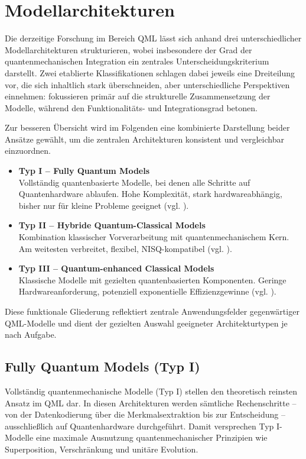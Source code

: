 \section{Modellarchitekturen}

Die derzeitige Forschung im Bereich QML lässt sich anhand drei unterschiedlicher Modellarchitekturen strukturieren, wobei insbesondere der Grad der quantenmechanischen Integration ein zentrales Unterscheidungskriterium darstellt. Zwei etablierte Klassifikationen
schlagen dabei jeweils eine Dreiteilung vor, die sich inhaltlich stark überschneiden, aber unterschiedliche Perspektiven einnehmen: \cite{chengNoisyIntermediatescaleQuantum2023} fokussieren primär auf die strukturelle Zusammensetzung der Modelle, während \cite{mitarai_k_et_al_quantum_2018} den Funktionalitäts- und Integrationsgrad betonen.

Zur besseren Übersicht wird im Folgenden eine kombinierte Darstellung beider Ansätze gewählt, um die zentralen Architekturen konsistent und vergleichbar einzuordnen. 


\begin{itemize}
  \item \textbf{Typ I – Fully Quantum Models} \\
  Vollständig quantenbasierte Modelle, bei denen alle Schritte auf Quantenhardware ablaufen. Hohe Komplexität, stark hardwareabhängig, bisher nur für kleine Probleme geeignet (vgl. \cite{chengNoisyIntermediatescaleQuantum2023, mitarai_k_et_al_quantum_2018}).

  \item \textbf{Typ II – Hybride Quantum-Classical Models} \\
  Kombination klassischer Vorverarbeitung mit quantenmechanischem Kern. Am weitesten verbreitet, flexibel, NISQ-kompatibel (vgl. \cite{mitarai_k_et_al_quantum_2018}).

  \item \textbf{Typ III – Quantum-enhanced Classical Models} \\
  Klassische Modelle mit gezielten quantenbasierten Komponenten. Geringe Hardwareanforderung, potenziell exponentielle Effizienzgewinne (vgl. \cite{chengNoisyIntermediatescaleQuantum2023}).
\end{itemize}


Diese funktionale Gliederung reflektiert zentrale Anwendungsfelder gegenwärtiger QML-Modelle und dient der gezielten Auswahl geeigneter Architekturtypen je nach Aufgabe.


\subsection{Fully Quantum Models (Typ I)}
Vollständig quantenmechanische Modelle (Typ I) stellen den theoretisch reinsten Ansatz im QML dar. In diesen Architekturen werden sämtliche Rechenschritte – von der Datenkodierung über die Merkmalsextraktion bis zur Entscheidung – ausschließlich auf Quantenhardware durchgeführt. Damit versprechen Typ I-Modelle eine maximale Ausnutzung quantenmechanischer Prinzipien wie Superposition, Verschränkung und unitäre Evolution.

